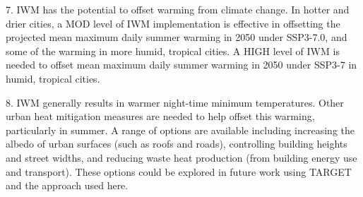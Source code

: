 \documentclass[utf8]{frontiersSCNS} %
\begin{document}
7. IWM has the potential to offset warming from climate change. In hotter and drier cities, a MOD level of IWM implementation is effective in offsetting the projected mean maximum daily summer warming in 2050 under SSP3-7.0, and some of the warming in more humid, tropical cities. A HIGH level of IWM is needed to offset mean maximum daily summer warming in 2050 under SSP3-7 in humid, tropical cities.

8. IWM generally results in warmer night-time minimum temperatures. Other urban heat mitigation measures are needed to help offset this warming, particularly in summer. A range of options are available including increasing the albedo of urban surfaces (such as roofs and roads), controlling building heights and street widths, and reducing waste heat production (from building energy use and transport). These options could be explored in future work using TARGET and the approach used here.







\end{document}
